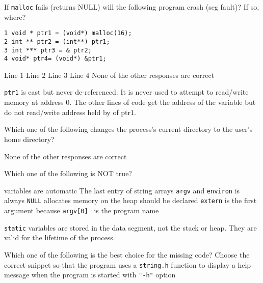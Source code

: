 \variant
If {\tt malloc} fails (returns NULL)  will the following program crash (seg fault)? If so, where?
\begin{verbatim}
1 void * ptr1 = (void*) malloc(16);
2 int ** ptr2 = (int**) ptr1;
3 int *** ptr3 = & ptr2;
4 void* ptr4= (void*) &ptr1;
\end{verbatim}
\begin{answers}
\answer Line $1$
\answer  Line $2$
\answer  Line $3$
\answer  Line $4$
\correctanswer None of the other responses are correct
\end{answers}
\begin{solution}
{\tt ptr1} is cast but never de-referenced: It is never used to attempt to read/write memory at address 0. The other lines of code get the address of the variable but do not read/write address held by of ptr1.
\end{solution}


\variant
Which one of the following changes the process's current directory to the user's home directory?
\begin{answers}
\answer None of the other responses are correct
\end{answers}
\begin{solution}
\end{solution}


\variant
Which one of the following is NOT true?
\begin{answers}
 variables are automatic
\answer The last entry of string arrays {\tt argv} and {\tt environ} is always {\tt NULL}
 allocates memory on the heap
 should be declared {\tt extern} 
 is the first argument because {\tt argv[0] } is the program name 
\end{answers}
\begin{solution}
{\tt static} variables are stored in the data segment, not the stack or heap. They are valid for the lifetime of the process.
\end{solution}



\variant
Which one of the following is the best choice for the missing code? Choose the correct snippet so that the program uses a {\tt string.h} function to display a help message when the program is started with {\tt "-h"} option

